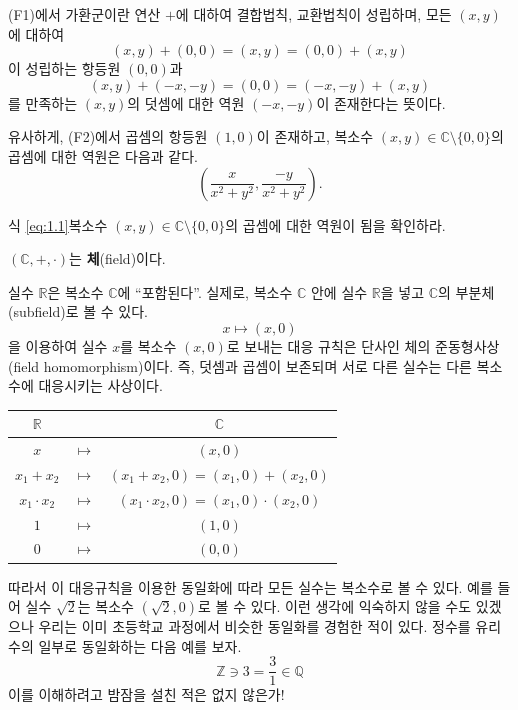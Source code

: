 (F1)에서 가환군이란
연산 $+$에 대하여 결합법칙, 교환법칙이 성립하며,
모든 $(x,y)$에 대하여
$$
(x,y) + (0,0) = (x,y) = (0,0) + (x,y)
$$
이 성립하는 
항등원 $(0,0)$과 
$$
(x,y) + (-x,-y) = (0,0) = (-x,-y) + (x,y)
$$
를 만족하는 $(x,y)$의 덧셈에 대한 역원 $(-x, -y)$이  존재한다는 뜻이다.

유사하게, (F2)에서 곱셈의 항등원 $(1,0)$이 존재하고, 복소수 $(x,y) \in \mathbb C \setminus\{0,0\}$의
곱셈에 대한 역원은 다음과 같다.
\begin{equation} \label{eq:1.1}
\left( \dfrac{x}{x^2+y^2}, \dfrac{-y}{x^2+y^2} \right).
\end{equation}

\begin{salt_exercise} \label{ex-1-1}
식 \eqref{eq:1.1}\이 복소수 $(x,y) \in \mathbb C \setminus\{0,0\}$의 곱셈에 대한 역원이 됨을 확인하라.
\end{salt_exercise}

\begin{saltprop}{}{} \label{prop-1-1}
$(\mathbb C, +, \cdot)$는 \textbf{체}(field)이다.
\end{saltprop}

실수  $\mathbb R$은 복소수 $\mathbb C$에 ``포함된다''.
실제로, 복소수 $\mathbb C$ 안에 실수 $\mathbb R$을 넣고
$\mathbb C$의 부분체(subfield)로 볼 수 있다.
$$
x \mapsto (x,0)
$$
을 이용하여 실수 $x$를 복소수 $(x,0)$로 보내는 대응 규칙은
단사인 체의 준동형사상(field homomorphism)이다.
즉, 덧셈과 곱셈이 보존되며 서로 다른 실수는 다른 복소수에 대응시키는 사상이다.

\begin{center}
\begin{tabular}{|ccc|} \hline
$\mathbb R$ & & $\mathbb C$ \\ \hline \hline
$x$ & $\mapsto$ & $(x,0)$ \\ 
$x_1+x_2$ & $\mapsto$ & $(x_1+x_2,0) = (x_1,0) + (x_2,0)$ \\ 
$x_1\cdot x_2$ & $\mapsto$ & $(x_1\cdot x_2,0) = (x_1,0) \cdot (x_2,0)$ \\ 
$1$ & $\mapsto$ & $(1,0)$ \\
$0$ & $\mapsto$ & $(0,0)$ \\
\hline
\end{tabular}
\end{center}

따라서 이 대응규칙을 이용한 동일화에 따라 모든 실수는 복소수로 볼 수 있다.
예를 들어 실수 $\sqrt{2}$는 복소수 $(\sqrt{2},0)$로 볼 수 있다.
이런 생각에 익숙하지 않을 수도 있겠으나 우리는 이미 초등학교 과정에서
비슷한 동일화를 경험한 적이 있다. 정수를 유리수의 일부로 동일화하는
다음 예를 보자.
$$
\mathbb Z  \ni 3 = \frac31 \in \mathbb Q
$$
이를 이해하려고 밤잠을 설친 적은 없지 않은가!

